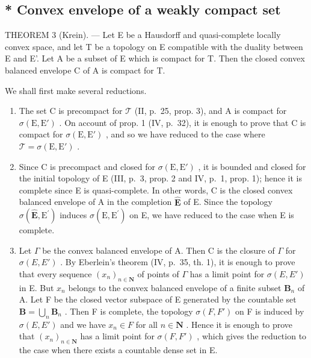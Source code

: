 \subsection{* Convex envelope of a weakly compact set}

THEOREM 3 (Krein). --- Let E be a Hausdorff and quasi-complete locally convex space, and let T be a topology on E compatible with the duality between E and E'. Let A be a subset of E which is compact for T. Then the closed convex balanced envelope C of A is compact for T.

We shall first make several reductions.

\begin{enumerate}
\def\labelenumi{\Alph{enumi})}
\item
  The set C is precompact for \(\mathcal{T}\) (II, p.~25, prop. 3), and A is compact for \(\sigma(\mathrm{E}, \mathrm{E}')\) . On account of prop. 1 (IV, p.~32), it is enough to prove that C is compact for \(\sigma(\mathrm{E}, \mathrm{E}')\) , and so we have reduced to the case where \(\mathcal{T} = \sigma(\mathrm{E}, \mathrm{E}')\) .
\item
  Since C is precompact and closed for \(\sigma(\mathrm{E}, \mathrm{E}')\) , it is bounded and closed for the initial topology of E (III, p.~3, prop. 2 and IV, p.~1, prop. 1); hence it is complete since E is quasi-complete. In other words, C is the closed convex balanced envelope of A in the completion \(\hat{\mathbf{E}}\) of E. Since the topology \(\sigma (\hat{\mathbf{E}},\mathrm{E}^{\prime})\) induces \(\sigma (\mathrm{E},\mathrm{E}^{\prime})\) on E, we have reduced to the case when E is complete.
\item
  Let \(\Gamma\) be the convex balanced envelope of A. Then C is the closure of \(\Gamma\) for \(\sigma(E, E')\) . By Eberlein's theorem (IV, p.~35, th. 1), it is enough to prove that every sequence \((x_n)_{n \in \mathbf{N}}\) of points of \(\Gamma\) has a limit point for \(\sigma(E, E')\) in E. But \(x_n\) belongs to the convex balanced envelope of a finite subset \(\mathbf{B}_n\) of A. Let F be the closed vector subspace of E generated by the countable set \(\mathbf{B} = \bigcup_{n} \mathbf{B}_n\) . Then F is complete, the topology \(\sigma(F, F')\) on F is induced by \(\sigma(E, E')\) and we have \(x_n \in F\) for all \(n \in \mathbf{N}\) . Hence it is enough to prove that \((x_n)_{n \in \mathbf{N}}\) has a limit point for \(\sigma(F, F')\) , which gives the reduction to the case when there exists a countable dense set in E.
\end{enumerate}

